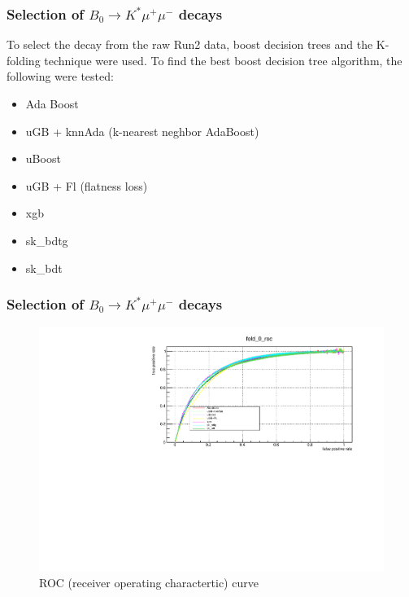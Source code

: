 \documentclass{beamer}
\begin{document}
\begin{frame}
  \frametitle{Selection of $B_0 \rightarrow K^* \mu^+ \mu^-$ decays}

To select the decay from the raw Run2 data, boost decision trees and the K-folding technique were used. To find the best boost decision tree algorithm, the following were tested:

\begin{itemize}
 \item Ada Boost
 \item uGB  + knnAda (k-nearest neghbor AdaBoost)
 \item uBoost
 \item uGB  + Fl (flatness loss)
 \item xgb
 \item sk\_bdtg
 \item sk\_bdt
\end{itemize}

\end{frame}



\begin{frame}
  \frametitle{Selection of $B_0 \rightarrow K^* \mu^+ \mu^-$ decays}

  \begin{figure}
   \includegraphics[width= 1.0\linewidth]{figures/roc}
   \caption{ROC (receiver operating charactertic) curve}
  \end{figure}

\end{frame}


\end{document}
